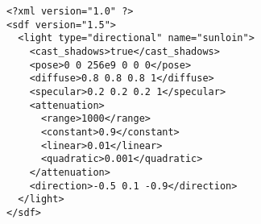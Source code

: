 \documentclass{article}
\begin{document}
\begin{lstlisting}
<?xml version="1.0" ?>
<sdf version="1.5">
  <light type="directional" name="sunloin">
    <cast_shadows>true</cast_shadows>
    <pose>0 0 256e9 0 0 0</pose>
    <diffuse>0.8 0.8 0.8 1</diffuse>
    <specular>0.2 0.2 0.2 1</specular>
    <attenuation>
      <range>1000</range>
      <constant>0.9</constant>
      <linear>0.01</linear>
      <quadratic>0.001</quadratic>
    </attenuation>
    <direction>-0.5 0.1 -0.9</direction>
  </light>
</sdf>
\end{lstlisting}
\end{document}
